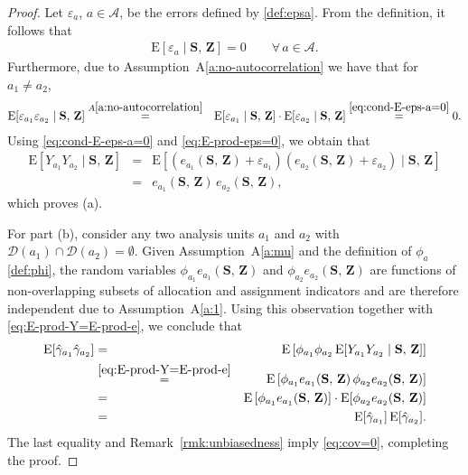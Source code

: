 \documentclass[sigconf]{acmart}
\newcommand{\E}{\mathrm E}
\begin{document}
\begin{proof}
    Let $\varepsilon_a$, $a\in\mathcal{A}$, be the errors defined by \eqref{def:epsa}. From the definition, it follows that
    \begin{eqnarray}\label{eq:cond-E-eps-a=0}
        \E[\varepsilon_a\mid \mathbf{S},\,\mathbf{Z}] = 0\qquad\forall\,a\in\mathcal A.
    \end{eqnarray}
    Furthermore, due to Assumption~A\ref{a:no-autocorrelation} we have that for $a_1\neq a_2$,
    \begin{eqnarray}\label{eq:E-prod-eps=0}
        \E[\varepsilon_{a_1}\varepsilon_{a_2}\mid \mathbf{S},\,\mathbf{Z}]
        &\stackrel{A\ref{a:no-autocorrelation}}{=}& \E[\varepsilon_{a_1}\mid \mathbf{S},\,\mathbf{Z}]\cdot
        \E[\varepsilon_{a_2}\mid \mathbf{S},\,\mathbf{Z}]
        \stackrel{\eqref{eq:cond-E-eps-a=0}}{=} 0.
    \end{eqnarray}
    Using \eqref{eq:cond-E-eps-a=0} and \eqref{eq:E-prod-eps=0}, we obtain that
    \begin{eqnarray}\label{eq:E-prod-Y=E-prod-e}
        \E[Y_{a_1}Y_{a_2}\mid \mathbf{S},\,\mathbf{Z}] &=& \E[
        (e_{a_1}(\mathbf{S},\,\mathbf{Z}) + \varepsilon_{a_1})
        (e_{a_2}(\mathbf{S},\,\mathbf{Z}) + \varepsilon_{a_2})\mid \mathbf{S},\,\mathbf{Z}
        ]\nonumber\\
        &=& e_{a_1}(\mathbf{S},\,\mathbf{Z})\,e_{a_2}(\mathbf{S},\,\mathbf{Z}),
    \end{eqnarray}
    which proves (a).

    For part (b), consider any two analysis units $a_1$ and $a_2$ with $\mathcal{D}(a_1)\cap \mathcal{D}(a_2)=\emptyset$. Given Assumption~A\ref{a:mu} and the definition of $\phi_a$ \eqref{def:phi}, the random variables $\phi_{a_1} e_{a_1}(\mathbf{S},\,\mathbf{Z})$ and $\phi_{a_2}e_{a_2}(\mathbf{S},\,\mathbf{Z})$ are functions of non-overlapping subsets of allocation and assignment indicators and are therefore independent due to Assumption~A\ref{a:1}. Using this observation together with \eqref{eq:E-prod-Y=E-prod-e}, we conclude that
    \begin{eqnarray}\label{eq:=0}
        \E[\hat\gamma_{a_1}\hat\gamma_{a_2}]
        &=& \E\left[\phi_{a_1}\phi_{a_2}\,\E[Y_{a_1}Y_{a_2}\mid \mathbf{S},\,\mathbf{Z}]\right]
        \nonumber\\
        &\stackrel{\eqref{eq:E-prod-Y=E-prod-e}}{=}& \E\left[\phi_{a_1}e_{a_1}(\mathbf{S},\,\mathbf{Z})\,\phi_{a_2}e_{a_2}(\mathbf{S},\,\mathbf{Z})\right]\nonumber\\
        &=& \E\left[\phi_{a_1}e_{a_1}(\mathbf{S},\,\mathbf{Z})\right]\cdot\E[\phi_{a_2}e_{a_2}(\mathbf{S},\,\mathbf{Z})] \nonumber\\
        &=& \E[\hat\gamma_{a_1}]\,\E[\hat\gamma_{a_2}].
    \end{eqnarray}
    The last equality and Remark~\ref{rmk:unbiasedness} imply \eqref{eq:cov=0}, completing the proof.
\end{proof}
\end{document}
